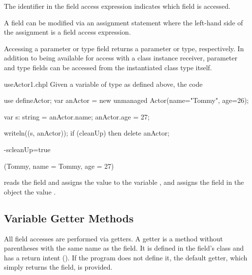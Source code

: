 The identifier in the field access expression indicates which field is accessed.


A field can
be modified via an assignment statement where the left-hand side of
the assignment is a field access expression.

Accessing a parameter or type field returns a parameter or type,
respectively. In addition to being available for access with a class
instance receiver, parameter and type fields can be accessed from the
instantiated class type itself.

\begin{chapelexample}{useActor1.chpl}
Given a variable  of type  as defined above,
the code
\begin{chapelpre}
use defineActor;
var anActor = new unmanaged Actor(name="Tommy", age=26);
\end{chapelpre}
\begin{chapel}
var s: string = anActor.name;
anActor.age = 27;
\end{chapel}
\begin{chapelpost}
writeln((s, anActor));
if (cleanUp) then delete anActor;
\end{chapelpost}
\begin{chapelcompopts}
-scleanUp=true
\end{chapelcompopts}
\begin{chapeloutput}
(Tommy, {name = Tommy, age = 27})
\end{chapeloutput}
reads the field  and assigns the value to the variable
, and assigns the field  in the object
 the value .
\end{chapelexample}

\subsection{Variable Getter Methods}
\label{Getter_Methods}

All field accesses are performed via getters.  A getter is a method without
parentheses with the same name as the field. It is defined in the field's class
and has a  return intent ().  If the program
does not define it, the default getter, which simply returns the field, is
provided.

